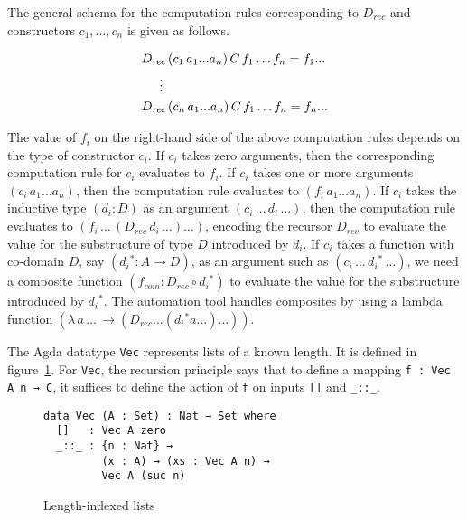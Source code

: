 \documentclass[sigplan,10pt]{acmart}
\begin{document}
The general schema for the computation rules corresponding to $D_{\mathit{rec}}$ and constructors $c_1, \ldots, c_n$ is given as follows.

\begin{center}
\begingroup
\fontsize{8.9pt}{2pt}\selectfont
\begin{align*}
& D_\mathit{rec} \, (c_1 \, a_1 ... a_n) \, C \, f_1 \ldots f_n = f_1 ...  \\
& \hspace{0.5cm} \vdots  \\
& D_\mathit{rec} \, (c_n \, a_1 ... a_n) \, C \, f_1 \ldots f_n = f_n ...  \\ 
\end{align*}
\endgroup
\end{center}
\normalsize

The value of $f_i$ on the right-hand side of the above computation rules depends on the type of constructor $c_i$. If $c_i$ takes zero arguments, then the corresponding computation rule for $c_i$ evaluates to $f_i$. If $c_i$ takes one or more arguments $(c_i \, a_1 \ldots a_n)$, then the computation rule evaluates to $(f_i \, a_1 \ldots a_n)$. If $c_i$ takes the inductive type $(d_i : D)$ as an argument $(c_i \, \ldots \, d_i \, \ldots)$, then the computation rule evaluates to $(f_i \, \ldots \, (D_\mathit{rec} \, d_i \, \ldots) \ldots)$, encoding the recursor $D_\mathit{rec}$ to evaluate the value for the substructure of type $D$ introduced by $d_i$. If $c_i$ takes a function with co-domain $D$, say $(d{_i}^* : A \to D)$, as an argument such as $(c_i \, \ldots \, d{_i}^* \, \ldots)$, we need a composite function $(f_{com} : D_\mathit{rec} \circ d{_i}^*)$ to evaluate the value for the substructure introduced by $d{_i}^*$. The automation tool handles composites by using a lambda function $(\lambda \, a \, \ldots \, \rightarrow (D_\mathit{rec} \ldots (d{_i}^* a \ldots) \ldots))$.

The Agda datatype \texttt{Vec} represents lists of a known length. It is defined in figure~\ref{fig:vec}. For {\tt Vec}, the recursion principle says that to define a mapping {\tt f : Vec A n → C}, it suffices to define the action of {\tt f} on inputs {\tt []} and {\tt \_::\_}.

\begin{figure}
\begin{center}
\begingroup
\begin{BVerbatim}
data Vec (A : Set) : Nat → Set where
  []   : Vec A zero
  _::_ : {n : Nat} →
         (x : A) → (xs : Vec A n) → 
         Vec A (suc n)
\end{BVerbatim}
\endgroup
\end{center}
\caption{Length-indexed lists}
\label{fig:vec}
\end{figure}
\end{document}
